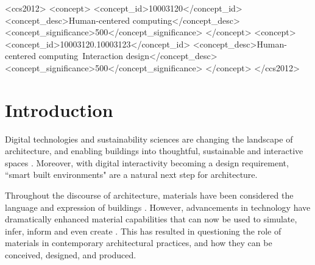\documentclass[manuscript, anonymous, review]{acmart}
\begin{document}
\begin{CCSXML}
<ccs2012>
   <concept>
       <concept_id>10003120</concept_id>
       <concept_desc>Human-centered computing</concept_desc>
       <concept_significance>500</concept_significance>
       </concept>
   <concept>
       <concept_id>10003120.10003123</concept_id>
       <concept_desc>Human-centered computing~Interaction design</concept_desc>
       <concept_significance>500</concept_significance>
       </concept>
 </ccs2012>
\end{CCSXML}




 
\maketitle

\section{Introduction}
Digital technologies and sustainability sciences are changing the landscape of architecture, and enabling buildings into thoughtful, sustainable and interactive spaces  \cite{kolarevic2004architecture}. Moreover, with digital interactivity becoming a design requirement, ``smart built environments" are a natural next step for architecture. 

Throughout the discourse of architecture, materials have been considered the language and expression of buildings \cite{schropfer2012material}. However, advancements in technology have dramatically enhanced material capabilities that can now be used to simulate, infer, inform and even create \cite{schropfer2012material, kolarevic2004architecture}. This has resulted in questioning the role of materials in contemporary architectural practices, and how they can be conceived, designed, and produced. 
\end{document}
